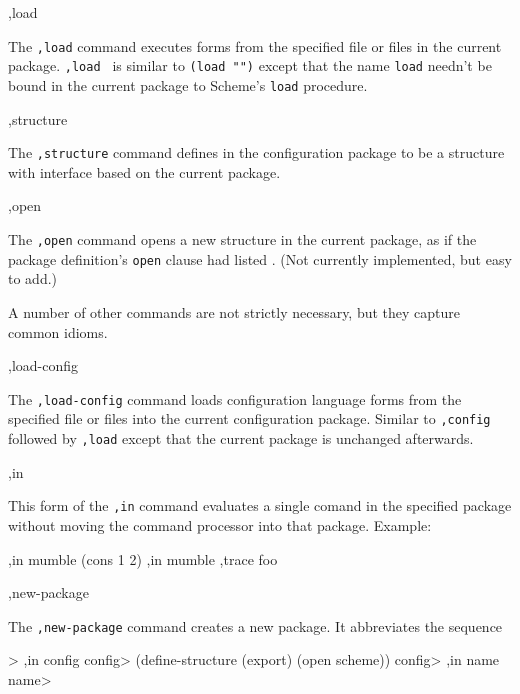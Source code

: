\begin{list}{}{}{}
\item
\begin{code}
,load  \etc
\end{code}
    The {\tt,load} command executes forms from the specified file or
    files in the current package.  {\tt,load } is similar
    to {\tt(load "")}
    except that the name {\tt load} needn't be bound in the current
    package to Scheme's {\tt load} procedure.

\item
\begin{code}
,structure  
\end{code}
    The {\tt,structure} command defines  in the
    configuration package to be a structure with interface
     based on the current package.

\item
\begin{code}
,open 
\end{code}
    The {\tt,open} command opens a new structure in the current
    package, as if the package definition's {\tt open} clause
    had listed .  (Not currently implemented, but
    easy to add.)
\end{list}


A number of other commands are not strictly necessary, but they
capture common idioms.

\begin{list}{}{}{}
\item
\begin{code}
,load-config  \etc
\end{code}
    The {\tt,load-config} command loads configuration language forms from
    the specified file or files into the current configuration package.
    Similar to {\tt,config} followed by {\tt,load} except that the current
    package is unchanged afterwards.

\item
\begin{code}
,in  
\end{code}
    This form of the {\tt,in} command evaluates a single comand in the
    specified package without moving the command processor into that
    package.  Example:
\begin{code}
    ,in mumble (cons 1 2)
    ,in mumble ,trace foo
\end{code}

\item
\begin{code}
,new-package   \etc
\end{code}
    The {\tt,new-package} command creates a new package.  It
    abbreviates the sequence 
\begin{code}
    > ,in config
    config> (define-structure  (export)
	      (open  \etc{} scheme))
    config> ,in name
    name> 
\end{code}

\end{list}



